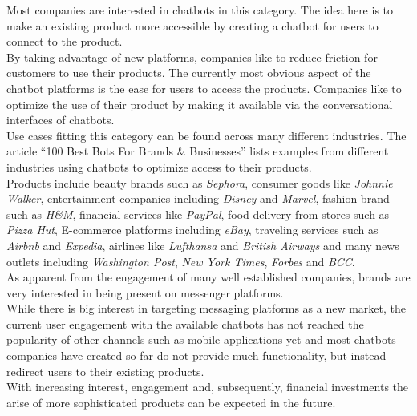 Most companies are interested in chatbots in this category.
The idea here is to make an existing product more accessible by creating a chatbot for users to connect to the product.
\\
By taking advantage of new platforms, companies like to reduce friction for customers to use their products.
The currently most obvious aspect of the chatbot platforms is the ease for users to access the products.
Companies like to optimize the use of their product by making it available via the conversational interfaces of chatbots.
\\

Use cases fitting this category can be found across many different industries.
The article ``100 Best Bots For Brands \& Businesses''\cite{topbots} lists examples from different industries using chatbots to optimize access to their products.
\\
Products include beauty brands such as \emph{Sephora}, consumer goods like \emph{Johnnie Walker}, entertainment companies including \emph{Disney} and \emph{Marvel}, fashion brand such as \emph{H\&M}, financial services like \emph{PayPal}, food delivery from stores such as \emph{Pizza Hut}, E-commerce platforms including \emph{eBay}, traveling services such as \emph{Airbnb} and \emph{Expedia}, airlines like \emph{Lufthansa} and \emph{British Airways} and many news outlets including \emph{Washington Post}, \emph{New York Times}, \emph{Forbes} and \emph{BCC}.
\\


As apparent from the engagement of many well established companies, brands are very interested in being present on messenger platforms.
\\

While there is big interest in targeting messaging platforms as a new market, the current user engagement with the available chatbots has not reached the popularity of other channels such as mobile applications yet
and most chatbots companies have created so far do not provide much functionality, but instead redirect users to their existing products.
\\

With increasing interest, engagement and, subsequently, financial investments the arise of more sophisticated products can be expected in the future.
